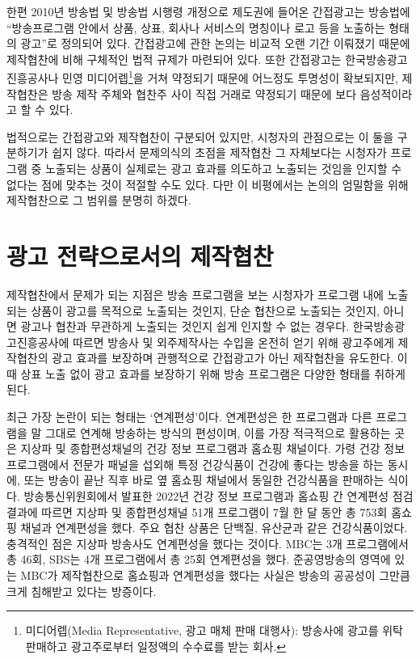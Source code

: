 한편 2010년 방송법 및 방송법 시행령 개정으로 제도권에 들어온 간접광고는 방송법에 ``방송프로그램 안에서 상품, 상표, 회사나 서비스의 명칭이나 로고 등을 노출하는 형태의 광고''로 정의되어 있다. 간접광고에 관한 논의는 비교적 오랜 기간 이뤄졌기 때문에 제작협찬에 비해 구체적인 법적 규제가 마련되어 있다. 또한 간접광고는 한국방송광고진흥공사나 민영 미디어렙\footnote{미디어렙(Media Representative, 광고 매체 판매 대행사): 방송사에 광고를 위탁 판매하고 광고주로부터 일정액의 수수료를 받는 회사.}을 거쳐 약정되기 때문에 어느정도 투명성이 확보되지만, 제작협찬은 방송 제작 주체와 협찬주 사이 직접 거래로 약정\cite{hkh2015}되기 때문에 보다 음성적이라고 할 수 있다.

법적으로는 간접광고와 제작협찬이 구분되어 있지만, 시청자의 관점으로는 이 둘을 구분하기가 쉽지 않다. 따라서 문제의식의 초점을 제작협찬 그 자체보다는 시청자가 프로그램 중 노출되는 상품이 실제로는 광고 효과를 의도하고 노출되는 것임을 인지할 수 없다는 점에 맞추는 것이 적절할 수도 있다. 다만 이 비평에서는 논의의 엄밀함을 위해 제작협찬으로 그 범위를 분명히 하겠다.

\section*{광고 전략으로서의 제작협찬}


제작협찬에서 문제가 되는 지점은 방송 프로그램을 보는 시청자가 프로그램 내에 노출되는 상품이 광고를 목적으로 노출되는 것인지, 단순 협찬으로 노출되는 것인지, 아니면 광고나 협찬과 무관하게 노출되는 것인지 쉽게 인지할 수 없는 경우다. 한국방송광고진흥공사에 따르면\cite{ndr2013} 방송사 및 외주제작사는 수입을 온전히 얻기 위해 광고주에게 제작협찬의 광고 효과를 보장하며 관행적으로 간접광고가 아닌 제작협찬을 유도한다. 이때 상표 노출 없이 광고 효과를 보장하기 위해 방송 프로그램은 다양한 형태를 취하게 된다.

최근 가장 논란이 되는 형태는 `연계편성'이다. 연계편성은 한 프로그램과 다른 프로그램을 말 그대로 연계해 방송하는 방식의 편성이며, 이를 가장 적극적으로 활용하는 곳은 지상파 및 종합편성채널의 건강 정보 프로그램과 홈쇼핑 채널이다. 가령 건강 정보 프로그램에서 전문가 패널을 섭외해 특정 건강식품이 건강에 좋다는 방송을 하는 동시에, 또는 방송이 끝난 직후 바로 옆 홈쇼핑 채널에서 동일한 건강식품을 판매하는 식이다. 방송통신위원회에서 발표한 2022년 건강 정보 프로그램과 홈쇼핑 간 연계편성 점검결과\cite{kcc2022}에 따르면 지상파 및 종합편성채널 51개 프로그램이 7월 한 달 동안 총 753회 홈쇼핑 채널과 연계편성을 했다. 주요 협찬 상품은 단백질, 유산균과 같은 건강식품이었다. 충격적인 점은 지상파 방송사도 연계편성을 했다는 것이다. MBC는 3개 프로그램에서 총 46회, SBS는 4개 프로그램에서 총 25회 연계편성을 했다. 준공영방송의 영역에 있는 MBC가 제작협찬으로 홈쇼핑과 연계편성을 했다는 사실은 방송의 공공성이 그만큼 크게 침해받고 있다는 방증이다.

